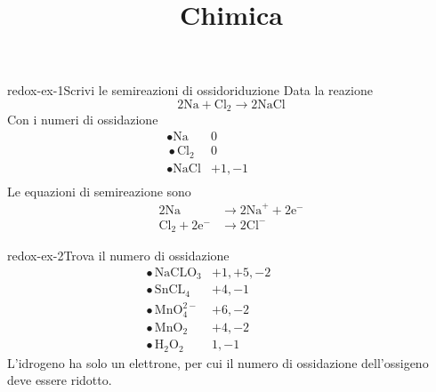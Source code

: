 \documentclass[preview]{standalone}
\begin{document}
\title{Chimica}
\genpage

\begin{snippetexercise}{redox-ex-1}{Scrivi le semireazioni di ossidoriduzione}
    Data la reazione
    \[
        2\text{Na} + \text{Cl}_2 \rightarrow 2\text{NaCl}
    \]
    Con i numeri di ossidazione
    \begin{align*}
        &\,\bullet \text{Na} & 0 &&&&&&\\
        &\,\bullet \text{Cl}_2 & 0 &&&&&&\\
        &\,\bullet \text{NaCl} & +1, -1 &&&&&&\\
    \end{align*}
    Le equazioni di semireazione sono
    \begin{align*}
        2\text{Na} &\rightarrow 2\text{Na}^+ + 2\text{e}^- \\
        \text{Cl}_2 + 2\text{e}^- &\rightarrow 2\text{Cl}^-
    \end{align*}
\end{snippetexercise}

\begin{snippetexercise}{redox-ex-2}{Trova il numero di ossidazione}
    \begin{align*}
        &\,\bullet \text{NaCLO}_3 & +1, +5, -2 &&&&&&\\
        &\,\bullet \text{SnCL}_4 & +4, -1 &&&&&&\\
        &\,\bullet \text{MnO}_4^{2-} & +6, -2 &&&&&&\\
        &\,\bullet \text{MnO}_2 & +4, -2 &&&&&&\\
        &\,\bullet \text{H}_2\text{O}_2 & 1, -1&&&&&&
    \end{align*}
    L'idrogeno ha solo un elettrone, per cui il numero di ossidazione dell'ossigeno deve essere
    ridotto.
\end{snippetexercise}
\end{document}
